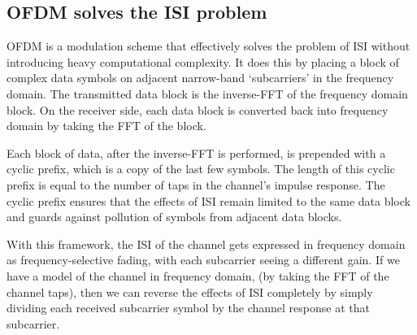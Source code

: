 \subsection{OFDM solves the ISI problem}

OFDM is a modulation scheme that effectively solves the problem of ISI without
introducing heavy computational complexity. It does this by placing a block of
complex data symbols on adjacent narrow-band `subcarriers' in the frequency
domain. The transmitted data block is the inverse-FFT of the frequency domain
block. On the receiver side, each data block is converted back into frequency
domain by taking the FFT of the block.

Each block of data, after the inverse-FFT is performed, is prepended with a
cyclic prefix, which is a copy of the last few symbols. The length of this
cyclic prefix is equal to the number of taps in the channel's impulse response.
The cyclic prefix ensures that the effects of ISI remain limited to the same
data block and guards against pollution of symbols from adjacent data blocks.

With this framework, the ISI of the channel gets expressed in frequency domain
as frequency-selective fading, with each subcarrier seeing a different gain.
If we have a model of the channel in frequency domain, (by taking the FFT of
the channel taps), then we can reverse the effects of ISI completely by simply
dividing each received subcarrier symbol by the channel response at that
subcarrier.

\cite{py:python}
